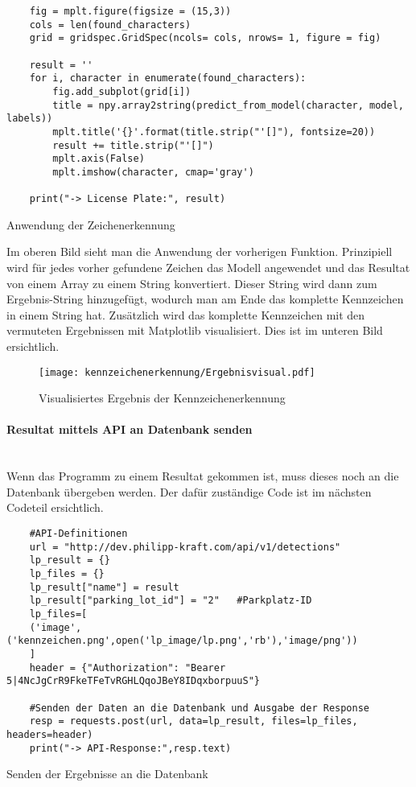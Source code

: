 \begin{longlisting}
    \begin{verbatim}
    fig = mplt.figure(figsize = (15,3))
    cols = len(found_characters)
    grid = gridspec.GridSpec(ncols= cols, nrows= 1, figure = fig)

    result = ''
    for i, character in enumerate(found_characters):
        fig.add_subplot(grid[i])
        title = npy.array2string(predict_from_model(character, model, labels))
        mplt.title('{}'.format(title.strip("'[]"), fontsize=20))
        result += title.strip("'[]")
        mplt.axis(False)
        mplt.imshow(character, cmap='gray')

    print("-> License Plate:", result)
    \end{verbatim}
    \caption{Anwendung der Zeichenerkennung}
\end{longlisting}

Im oberen Bild sieht man die Anwendung der vorherigen Funktion. Prinzipiell wird für jedes vorher gefundene Zeichen das Modell angewendet 
und das Resultat von einem Array zu einem String konvertiert. Dieser String wird dann zum Ergebnis-String hinzugefügt, wodurch man am Ende das 
komplette Kennzeichen in einem String hat. Zusätzlich wird das komplette Kennzeichen mit den vermuteten Ergebnissen mit Matplotlib visualisiert. 
Dies ist im unteren Bild ersichtlich.

\begin{figure}[H]
    \centering
    \texttt{[image: kennzeichenerkennung/Ergebnisvisual.pdf]}
    \caption{Visualisiertes Ergebnis der Kennzeichenerkennung}
\end{figure}

\paragraph{Resultat mittels API an Datenbank senden}\mbox{}\\

Wenn das Programm zu einem Resultat gekommen ist, muss dieses noch an die Datenbank übergeben werden. Der dafür zuständige Code ist im nächsten Codeteil ersichtlich.

\begin{longlisting}
    \begin{verbatim}
    #API-Definitionen
    url = "http://dev.philipp-kraft.com/api/v1/detections"
    lp_result = {}
    lp_files = {}
    lp_result["name"] = result 
    lp_result["parking_lot_id"] = "2"   #Parkplatz-ID 
    lp_files=[
    ('image',('kennzeichen.png',open('lp_image/lp.png','rb'),'image/png'))
    ]
    header = {"Authorization": "Bearer 5|4NcJgCrR9FkeTFeTvRGHLQqoJBeY8IDqxborpuuS"}

    #Senden der Daten an die Datenbank und Ausgabe der Response
    resp = requests.post(url, data=lp_result, files=lp_files, headers=header)
    print("-> API-Response:",resp.text)
    \end{verbatim}
    \caption{Senden der Ergebnisse an die Datenbank}
\end{longlisting}

